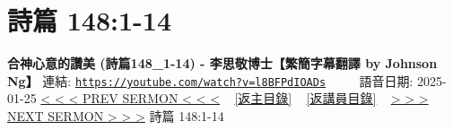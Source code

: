 \documentclass{book}
\begin{document}
\section{詩篇 148:1-14}
\label{sec:l8BFPdIOADs}
\textbf{合神心意的讚美 (詩篇148\_1-14) - 李思敬博士【繁簡字幕翻譯 by Johnson Ng】}
\newline
\newline
連結: \href{https://youtube.com/watch?v=l8BFPdIOADs}{\texttt{https://youtube.com/watch?v=l8BFPdIOADs}} ~~~~ 語音日期: 2025-01-25
\newline
\newline
\hyperref[sec:YdX9gstJs1g]{< < < PREV SERMON < < <}
~
\hyperlink{toc}{[返主目錄]}
~
\hyperref[ch:preacher5]{[返講員目錄]}
~
\hyperref[sec:fJrsPMmDHtU]{> > > NEXT SERMON > > >}
\newline
\newline
詩篇 148:1-14
\newline
\end{document}
